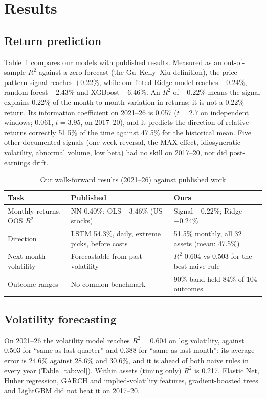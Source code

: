 \documentclass[conference]{IEEEtran}
\begin{document}
\section{Results}

\subsection{Return prediction}
Table~\ref{tab:lit} compares our models with published results. Measured as an out-of-sample $R^2$ against a zero forecast (the Gu--Kelly--Xiu definition), the price-pattern signal reaches $+0.22\%$, while our fitted Ridge model reaches $-0.24\%$, random forest $-2.43\%$ and XGBoost $-6.46\%$. An $R^2$ of $+0.22\%$ means the signal explains 0.22\% of the month-to-month variation in returns; it is not a 0.22\% return. Its information coefficient on 2021--26 is 0.057 ($t = 2.7$ on independent windows; 0.061, $t = 3.95$, on 2017--20), and it predicts the direction of relative returns correctly 51.5\% of the time against 47.5\% for the historical mean. Five other documented signals (one-week reversal, the MAX effect, idiosyncratic volatility, abnormal volume, low beta) had no skill on 2017--20, nor did post-earnings drift.

\begin{table}[t]
\caption{Our walk-forward results (2021--26) against published work}
\label{tab:lit}
\centering
\setlength{\tabcolsep}{3pt}
\begin{tabular}{@{}p{1.55cm}p{3.15cm}p{3.05cm}@{}}
\toprule
Task & Published & Ours \\
\midrule
Monthly returns, OOS $R^2$ & NN 0.40\%; OLS $-3.46\%$ (US stocks) \cite{gu2020} & Signal $+0.22\%$; Ridge $-0.24\%$ \\
Direction & LSTM 54.3\%, daily, extreme picks, before costs \cite{fischer2018} & 51.5\% monthly, all 32 assets (mean: 47.5\%) \\
Next-month volatility & Forecastable from past volatility \cite{corsi2009} & $R^2$ 0.604 vs 0.503 for the best naive rule \\
Outcome ranges & No common benchmark & 90\% band held 84\% of 104 outcomes \\
\bottomrule
\end{tabular}
\end{table}

\subsection{Volatility forecasting}
On 2021--26 the volatility model reaches $R^2 = 0.604$ on log volatility, against 0.503 for ``same as last quarter'' and 0.388 for ``same as last month''; its average error is 24.6\% against 28.6\% and 30.6\%, and it is ahead of both naive rules in every year (Table~\ref{tab:vol}). Within assets (timing only) $R^2$ is 0.217. Elastic Net, Huber regression, GARCH and implied-volatility features, gradient-boosted trees and LightGBM did not beat it on 2017--20.
\end{document}
